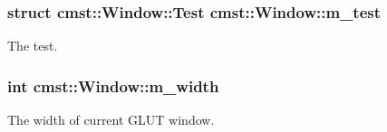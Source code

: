 \subsubsection[{\texorpdfstring{m\+\_\+test}{m_test}}]{\setlength{\rightskip}{0pt plus 5cm}struct {\bf cmst\+::\+Window\+::\+Test}  cmst\+::\+Window\+::m\+\_\+test\hspace{0.3cm}{\ttfamily [protected]}}\hypertarget{classcmst_1_1_window_aedae466fb2efd886cea6d775b20fabe3}{}\label{classcmst_1_1_window_aedae466fb2efd886cea6d775b20fabe3}


The test. 

\subsubsection[{\texorpdfstring{m\+\_\+width}{m_width}}]{\setlength{\rightskip}{0pt plus 5cm}int cmst\+::\+Window\+::m\+\_\+width\hspace{0.3cm}{\ttfamily [private]}}\hypertarget{classcmst_1_1_window_a2955f1032cf2ab577a5f01776e46f671}{}\label{classcmst_1_1_window_a2955f1032cf2ab577a5f01776e46f671}


The width of current G\+L\+UT window. 

